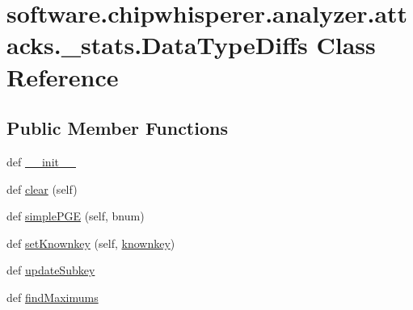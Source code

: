 \hypertarget{classsoftware_1_1chipwhisperer_1_1analyzer_1_1attacks_1_1__stats_1_1DataTypeDiffs}{}\section{software.\+chipwhisperer.\+analyzer.\+attacks.\+\_\+stats.\+Data\+Type\+Diffs Class Reference}
\label{classsoftware_1_1chipwhisperer_1_1analyzer_1_1attacks_1_1__stats_1_1DataTypeDiffs}
\subsection*{Public Member Functions}
\begin{DoxyCompactItemize}
\item 
def \hyperlink{classsoftware_1_1chipwhisperer_1_1analyzer_1_1attacks_1_1__stats_1_1DataTypeDiffs_af4082309215fba65b2bd5e9ff6076318}{\+\_\+\+\_\+init\+\_\+\+\_\+}
\item 
def \hyperlink{classsoftware_1_1chipwhisperer_1_1analyzer_1_1attacks_1_1__stats_1_1DataTypeDiffs_a6cf149e2695e3ac09d6a73b862abbb91}{clear} (self)
\item 
def \hyperlink{classsoftware_1_1chipwhisperer_1_1analyzer_1_1attacks_1_1__stats_1_1DataTypeDiffs_a15b11d03221933995cb06089fb689f34}{simple\+P\+G\+E} (self, bnum)
\item 
def \hyperlink{classsoftware_1_1chipwhisperer_1_1analyzer_1_1attacks_1_1__stats_1_1DataTypeDiffs_aa3e4b1a202e19a527dfd7686d88858e2}{set\+Knownkey} (self, \hyperlink{classsoftware_1_1chipwhisperer_1_1analyzer_1_1attacks_1_1__stats_1_1DataTypeDiffs_ae06b03c5b428cbf97d5d6d6927d0d149}{knownkey})
\item 
def \hyperlink{classsoftware_1_1chipwhisperer_1_1analyzer_1_1attacks_1_1__stats_1_1DataTypeDiffs_a9f2831706436352d97c26cab669a1ca8}{update\+Subkey}
\item 
def \hyperlink{classsoftware_1_1chipwhisperer_1_1analyzer_1_1attacks_1_1__stats_1_1DataTypeDiffs_a8b1a7c646b91a48928d08a125b4463e6}{find\+Maximums}
\end{DoxyCompactItemize}
